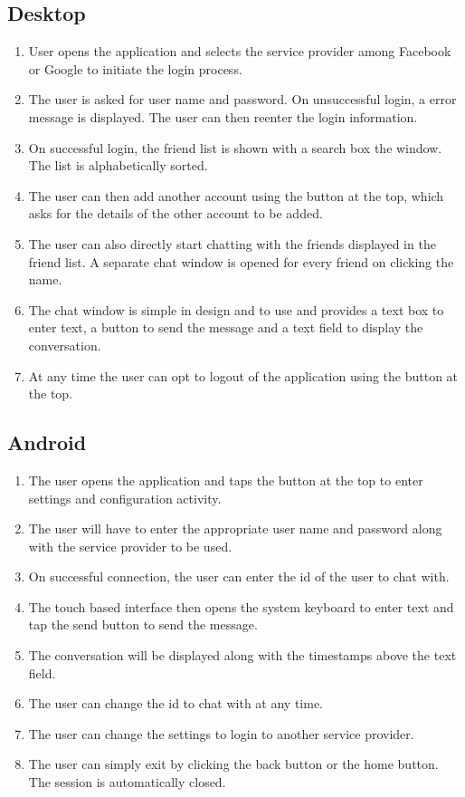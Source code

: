 \documentclass{SureshLimkar}
\begin{document}
\subsection{Desktop}
\begin{enumerate}
 \item User opens the application and selects the service provider among Facebook or Google to initiate the login process.
 \item The user is asked for user name and password. On unsuccessful login, a error message is displayed. The user can then reenter the login information.
 \item On successful login, the friend list is shown with a search box the window. The list is alphabetically sorted. 
 \item The user can then add another account using the button at the top, which asks for the details of the other account to be added.
 \item The user can also directly start chatting with the friends displayed in the friend list. A separate chat window is opened for every friend on clicking the name.
 \item The chat window is simple in design and to use and provides a text box to enter text, a button to send the message and a text field to display the conversation.
 \item At any time the user can opt to logout of the application using the button at the top. 
\end{enumerate}

\subsection{Android}
\begin{enumerate}
 \item The user opens the application and taps the button at the top to enter settings and configuration activity.
 \item The user will have to enter the appropriate user name and password along with the service provider to be used.
 \item On successful connection, the user can enter the id of the user to chat with.
 \item The touch based interface then opens the system keyboard to enter text and tap the send button to send the message.
 \item The conversation will be displayed along with the timestamps above the text field. 
  \item The user can change the id to chat with at any time.
 \item The user can change the settings to login to another service provider.
 \item The user can simply exit by clicking the back button or the home button. The session is automatically closed.
\end{enumerate}
\end{document}
